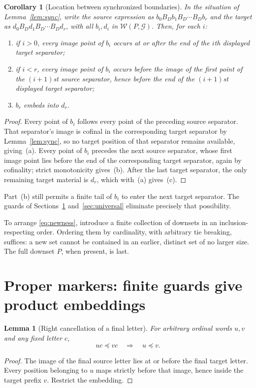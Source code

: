 \documentclass[11pt,a4paper]{article}
\numberwithin{equation}{section}
\newtheorem{lemma}[theorem]{Lemma}
\newtheorem{corollary}[theorem]{Corollary}
\theoremstyle{definition}
\theoremstyle{remark}
\newcommand{\W}{\mathcal W}
\newcommand{\G}{\mathcal G}
\newcommand{\emb}{\preccurlyeq}
\begin{document}
\begin{corollary}[Location between synchronized boundaries]\label{cor:between}
In the situation of Lemma~\ref{lem:sync}, write the source expression as
$b_0B_Db_1B_D\cdots B_Db_r$ and the target as $d_0B_Dd_1B_D\cdots B_Dd_r$,
with all $b_i,d_i$ in $\W(P,\G)$. Then, for each $i$:
\begin{enumerate}[label=\textnormal{(\alph*)}]
\item if $i>0$, every image point of $b_i$ occurs at or after the end of the
      $i$th displayed target separator;
\item if $i<r$, every image point of $b_i$ occurs before the image of the
      first point of the $(i+1)$st source separator, hence before the end of
      the $(i+1)$st displayed target separator;
\item $b_r$ embeds into $d_r$.
\end{enumerate}
\end{corollary}
\begin{proof}
Every point of $b_i$ follows every point of the preceding source separator.
That separator's image is cofinal in the corresponding target separator by
Lemma~\ref{lem:sync}, so no target position of that separator remains
available, giving~(a). Every point of $b_i$ precedes the next source
separator, whose first image point lies before the end of the corresponding
target separator, again by cofinality; strict monotonicity gives~(b).
After the last target separator, the only remaining target material is $d_r$,
which with~(a) gives~(c).
\end{proof}

Part~(b) still permits a finite tail of $b_i$ to enter the next target
separator. The guards of Sections~\ref{sec:proper} and~\ref{sec:universal}
eliminate precisely that possibility.

To arrange \eqref{eq:newness}, introduce a finite collection of downsets in
an inclusion-respecting order. Ordering them by cardinality, with arbitrary
tie breaking, suffices: a new set cannot be contained in an earlier,
distinct set of no larger size. The full downset $P$, when present, is last.

\section{Proper markers: finite guards give product embeddings}
\label{sec:proper}

\begin{lemma}[Right cancellation of a final letter]\label{lem:cancel}
For arbitrary ordinal words $u,v$ and any fixed letter $c$,
\[
 uc\emb vc\quad\Longrightarrow\quad u\emb v.
\]
\end{lemma}
\begin{proof}
The image of the final source letter lies at or before the final target
letter. Every position belonging to $u$ maps strictly before that image,
hence inside the target prefix $v$. Restrict the embedding.
\end{proof}
\end{document}
